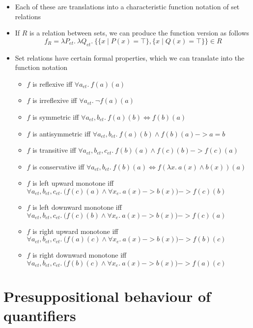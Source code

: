 \documentclass[a4paper]{article}
\begin{document}
\begin{itemize}
\item Each of these are translations into a characteristic function notation of set relations
\item If $R$ is a relation between sets, we can produce the function version as follows
  $$f_R = \lambda P_{et}.\ \lambda Q_{et}.\ \{\{x\mid P(x) = \top\},\{x\mid Q(x) = \top\}\}\in R$$
\item Set relations have certain formal properties, which we can translate into the function notation
  \begin{itemize}
  \item $f$ is reflexive iff $\forall a_{et}.\ f(a)(a)$
  \item $f$ is irreflexive iff $\forall a_{et}.\ \lnot f(a)(a)$
  \item $f$ is symmetric iff $\forall a_{et}, b_{et}.\ f(a)(b) \iff f(b)(a)$
  \item $f$ is antisymmetric iff $\forall a_{et}, b_{et}.\ f(a)(b) \land f(b)(a) -> a = b$
  \item $f$ is transitive iff $\forall a_{et}, b_{et}, c_{et}.\ f(b)(a) \land f(c)(b) -> f(c)(a)$
  \item $f$ is conservative iff $\forall a_{et}, b_{et}.\ f(b)(a) \iff f(\lambda x.\ a(x) \land b(x))(a)$
  \item $f$ is left upward monotone iff $\forall a_{et}, b_{et}, c_{et}.\ \Big(f(c)(a) \land \forall x_e.\ a(x)
    -> b(x)\Big) -> f(c)(b)$
  \item $f$ is left downward monotone iff $\forall a_{et}, b_{et}, c_{et}.\ \Big(f(c)(b) \land \forall x_e.\ a(x)
    -> b(x)\Big) -> f(c)(a)$
  \item $f$ is right upward monotone iff $\forall a_{et}, b_{et}, c_{et}.\ \Big(f(a)(c) \land \forall x_e.\ a(x)
    -> b(x)\Big) -> f(b)(c)$
  \item $f$ is right downward monotone iff $\forall a_{et}, b_{et}, c_{et}.\ \Big(f(b)(c) \land \forall x_e.\ a(x)
    -> b(x)\Big) -> f(a)(c)$
  \end{itemize}
\end{itemize}


\section{Presuppositional behaviour of quantifiers}
\end{document}
